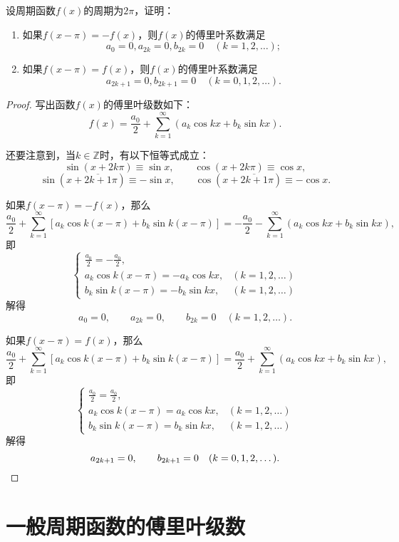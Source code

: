 \begin{example}
设周期函数\(f(x)\)的周期为\(2\pi\)，证明：\begin{enumerate}
\item 如果\(f(x-\pi) = -f(x)\)，则\(f(x)\)的傅里叶系数满足\[
a_0 = 0,
a_{2k} = 0,
b_{2k} = 0
\quad(k=1,2,\dotsc);
\]
\item 如果\(f(x-\pi) = f(x)\)，则\(f(x)\)的傅里叶系数满足\[
a_{2k+1} = 0,
b_{2k+1} = 0
\quad(k=0,1,2,\dotsc).
\]
\end{enumerate}
\begin{proof}
写出函数\(f(x)\)的傅里叶级数如下：\[
f(x) = \frac{a_0}{2} + \sum\limits_{k=1}^\infty \left(
a_k \cos kx
+ b_k \sin kx
\right).
\]

还要注意到，当\(k\in\mathbb{Z}\)时，有以下恒等式成立：\[
\sin(x+2k\pi) \equiv \sin x, \qquad
\cos(x+2k\pi) \equiv \cos x,
\]\[
\sin(x+\overline{2k+1}\pi) \equiv -\sin x, \qquad
\cos(x+\overline{2k+1}\pi) \equiv -\cos x.
\]

如果\(f(x-\pi) = -f(x)\)，那么\[
\frac{a_0}{2} + \sum\limits_{k=1}^\infty \left[
a_k \cos k(x-\pi)
+ b_k \sin k(x-\pi)
\right]
=
-\frac{a_0}{2} - \sum\limits_{k=1}^\infty \left(
a_k \cos kx
+ b_k \sin kx
\right),
\]即\[
\left\{ \begin{array}{ll}
\frac{a_0}{2} = -\frac{a_0}{2}, \\
a_k \cos k(x-\pi) = - a_k \cos kx, &(k=1,2,\dotsc) \\
b_k \sin k(x-\pi) = - b_k \sin kx, &(k=1,2,\dotsc)
\end{array} \right.
\]解得\[
a_0 = 0, \qquad
a_{2k} = 0, \qquad
b_{2k} = 0
\quad(k=1,2,\dotsc).
\]

如果\(f(x-\pi) = f(x)\)，那么\[
\frac{a_0}{2} + \sum\limits_{k=1}^\infty \left[
a_k \cos k(x-\pi)
+ b_k \sin k(x-\pi)
\right]
=
\frac{a_0}{2} + \sum\limits_{k=1}^\infty \left(
a_k \cos kx
+ b_k \sin kx
\right),
\]即\[
\left\{ \begin{array}{ll}
\frac{a_0}{2} = \frac{a_0}{2}, \\
a_k \cos k(x-\pi) = a_k \cos kx, &(k=1,2,\dotsc) \\
b_k \sin k(x-\pi) = b_k \sin kx, &(k=1,2,\dotsc)
\end{array} \right.
\]解得\[
a_{2k+1} = 0, \qquad
b_{2k+1} = 0
\quad(k=0,1,2,\dotsc).
\qedhere
\]
\end{proof}
\end{example}


\section{一般周期函数的傅里叶级数}
